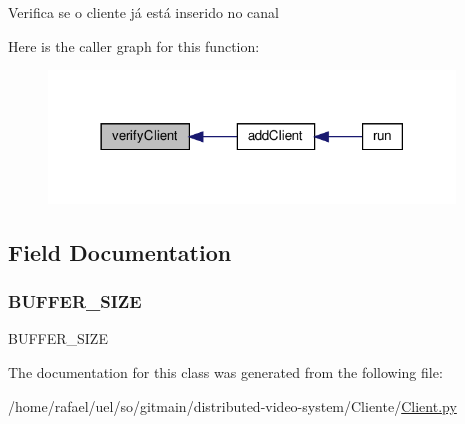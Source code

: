\begin{DoxyVerb}Verifica se o cliente já está inserido no canal\end{DoxyVerb}
 Here is the caller graph for this function\+:
\nopagebreak
\begin{figure}[H]
\begin{center}
\leavevmode
\includegraphics[width=306pt]{class_client_1_1_client_reseiver_aa5069a51ca05aeb44e006dba3be07296_icgraph}
\end{center}
\end{figure}


\subsection{Field Documentation}
\mbox{\label{class_client_1_1_client_reseiver_aa300d171bb6f6573a2de65c5342303c9}} 
\subsubsection{\texorpdfstring{B\+U\+F\+F\+E\+R\+\_\+\+S\+I\+ZE}{BUFFER\_SIZE}}
{\footnotesize\ttfamily B\+U\+F\+F\+E\+R\+\_\+\+S\+I\+ZE}



The documentation for this class was generated from the following file\+:\begin{DoxyCompactItemize}
\item 
/home/rafael/uel/so/gitmain/distributed-\/video-\/system/\+Cliente/\hyperlink{_client_8py}{Client.\+py}\end{DoxyCompactItemize}
